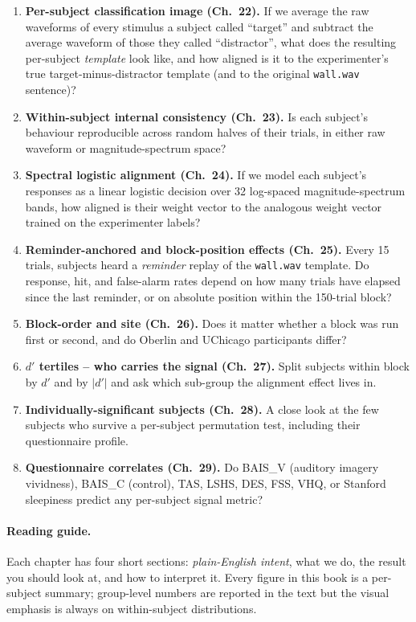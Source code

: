 \documentclass[11pt]{article}
\begin{document}
\begin{enumerate}
\item \textbf{Per-subject classification image (Ch.~22).} If we average the
      raw waveforms of every stimulus a subject called ``target'' and
      subtract the average waveform of those they called ``distractor'',
      what does the resulting per-subject \emph{template} look like, and
      how aligned is it to the experimenter's true target-minus-distractor
      template (and to the original \texttt{wall.wav} sentence)?
\item \textbf{Within-subject internal consistency (Ch.~23).} Is each
      subject's behaviour reproducible across random halves of their
      trials, in either raw waveform or magnitude-spectrum space?
\item \textbf{Spectral logistic alignment (Ch.~24).} If we model each
      subject's responses as a linear logistic decision over 32 log-spaced
      magnitude-spectrum bands, how aligned is their weight vector to the
      analogous weight vector trained on the experimenter labels?
\item \textbf{Reminder-anchored and block-position effects (Ch.~25).} Every
      15 trials, subjects heard a \emph{reminder} replay of the
      \texttt{wall.wav} template. Do response, hit, and false-alarm rates
      depend on how many trials have elapsed since the last reminder,
      or on absolute position within the 150-trial block?
\item \textbf{Block-order and site (Ch.~26).} Does it matter whether a
      block was run first or second, and do Oberlin and UChicago
      participants differ?
\item \textbf{$d'$ tertiles -- who carries the signal (Ch.~27).} Split
      subjects within block by $d'$ and by $|d'|$ and ask which
      sub-group the alignment effect lives in.
\item \textbf{Individually-significant subjects (Ch.~28).} A close
      look at the few subjects who survive a per-subject permutation
      test, including their questionnaire profile.
\item \textbf{Questionnaire correlates (Ch.~29).} Do BAIS\_V (auditory
      imagery vividness), BAIS\_C (control), TAS, LSHS, DES, FSS,
      VHQ, or Stanford sleepiness predict any per-subject signal
      metric?
\end{enumerate}

\paragraph{Reading guide.}
Each chapter has four short sections: \emph{plain-English intent}, what we
do, the result you should look at, and how to interpret it. Every figure in
this book is a per-subject summary; group-level numbers are reported in the
text but the visual emphasis is always on within-subject distributions.
\end{document}
